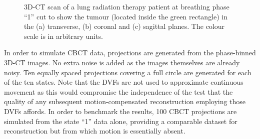 \begin{figure}[H]
\begin{center}
{}\hfill
{}\hfill
\hspace*{\fill} 

\caption{\label{fig:realthorax} 3D-CT scan of a lung radiation therapy patient at breathing phase ``1'' cut to show the tumour (located inside the green rectangle) in the (a) transverse, (b) coronal and (c) sagittal planes.  The colour scale is in arbitrary units.} 
\end{center} 
\end{figure}



In order to simulate CBCT data, projections are generated from the phase-binned 3D-CT images.  No extra noise is added as the images themselves are already noisy.  Ten equally spaced projections covering a full circle are generated for each of the ten states.  Note that the DVFs are not used to approximate continuous movement as this would compromise the independence of the test that the quality of any subsequent motion-compensated reconstruction employing those DVFs affords.  In order to benchmark the results, 100 CBCT projections are simulated from the state ``1'' data alone, providing a comparable dataset for reconstruction but from which motion is essentially absent.

